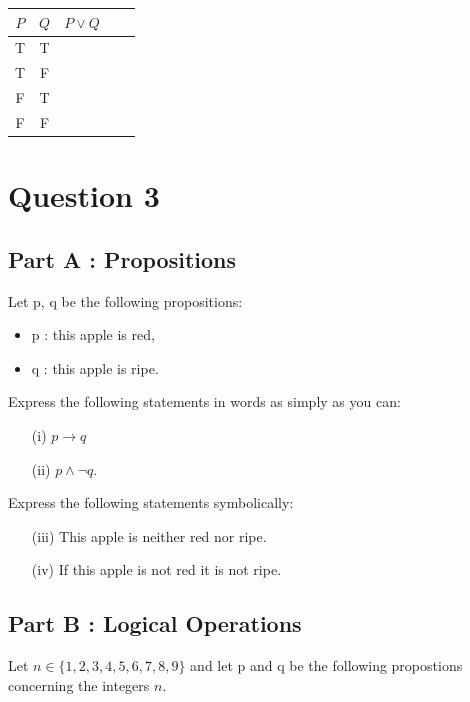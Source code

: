 \documentclass[]{report}
\begin{document}
\begin{enumerate}
\begin{tabular}{|c|c|c|c|c|}
\hline $P$ & $Q$ & $P \vee Q$ &  &  \\ \hline
\hline T & T &  &  &  \\ 
\hline T & F &  &  &  \\ 
\hline F & T &  &  &  \\ 
\hline \phantom{sp}F \phantom{sp} & \phantom{sp}F \phantom{sp} & \phantom{spacespa} & \phantom{spacespa}  & \phantom{spacespa} \\ 

\hline 
\end{tabular} 

\newpage



\section*{Question 3}
\subsection*{Part A : Propositions}
Let p, q be the following propositions:
\begin{itemize}
\item p : this apple is red, 
\item q : this apple is ripe.
\end{itemize}

\noindent Express the following statements in words as simply as you can:
\begin{itemize}
\item[(i)] $p \rightarrow q$
\item[(ii)] $p \wedge \neg q$.
\end{itemize}

\noindent Express the following statements symbolically:
\begin{itemize}
\item[(iii)] This apple is neither red nor ripe.
\item[(iv)] If this apple is not red it is not ripe.
\end{itemize}

\subsection*{Part B : Logical Operations}
Let $n \in \{1,2,3,4,5,6,7,8,9\}$ and let p and q be the following propostions concerning 
the integers $n$.


\end{enumerate}
\end{document}
